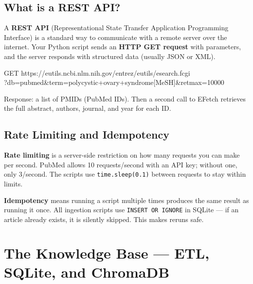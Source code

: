 \documentclass[11pt,a4paper]{article}
\begin{document}
\subsection{What is a REST API?}

A \textbf{REST API} (Representational State Transfer Application Programming Interface)
is a standard way to communicate with a remote server over the internet.
Your Python script sends an \textbf{HTTP GET request} with parameters, and the server
responds with structured data (usually JSON or XML).

\begin{tcolorbox}[colback=PurpleLight, colframe=Purple, boxrule=0.8pt,
  left=8pt, right=8pt, top=5pt, bottom=5pt, title={\small\bfseries Example: PubMed ESearch call},
  fonttitle=\color{white}, colbacktitle=Purple]
{\small\ttfamily
GET https://eutils.ncbi.nlm.nih.gov/entrez/eutils/esearch.fcgi\\
\quad ?db=pubmed\&term=polycystic+ovary+syndrome[MeSH]\&retmax=10000

\vspace{4pt}
\normalfont\small
Response: a list of PMIDs (PubMed IDs). Then a second call to EFetch retrieves
the full abstract, authors, journal, and year for each ID.
}
\end{tcolorbox}

\subsection{Rate Limiting and Idempotency}

\textbf{Rate limiting} is a server-side restriction on how many requests you can make per
second. PubMed allows 10 requests/second with an API key; without one, only 3/second.
The scripts use \texttt{time.sleep(0.1)} between requests to stay within limits.

\textbf{Idempotency} means running a script multiple times produces the same result as
running it once. All ingestion scripts use \texttt{INSERT OR IGNORE} in SQLite ---
if an article already exists, it is silently skipped. This makes reruns safe.

\section{The Knowledge Base --- ETL, SQLite, and ChromaDB}
\end{document}
